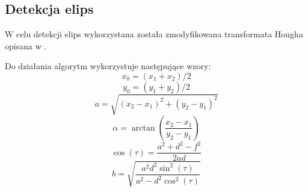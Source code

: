 \documentclass{classrep}
\begin{document}
\subsection{Detekcja elips}
W celu detekcji elips wykorzystana została zmodyfikowana transformata Hougha opisana w \cite{hough}. 

Do działania algorytm wykorzystuje następujące wzory:
\begin{equation}
\label{eq:x0}
 x_0 = (x_1 + x_2) / 2
\end{equation}
\begin{equation}
\label{eq:y0}
 y_0 = (y_1 + y_2) / 2
\end{equation}
\begin{equation}
\label{eq:a}
 a = \sqrt{(x_2 - x_1)^2 + (y_2 - y_1)^2}
\end{equation}
\begin{equation}
\label{eq:alfa}
 \alpha = \arctan{\left(\frac{x_2 - x_1}{y_2 - y_1}\right)}
\end{equation}
\begin{equation}
\label{eq:costau}
 \cos(\tau) = \frac{a^2 + d^2 - f^2}{2ad}
\end{equation}
\begin{equation}
\label{eq:b}
 b = \sqrt{\frac{a^2 d^2 \sin^2(\tau)}{a^2 - d^2\cos^2(\tau)}}
\end{equation}
\end{document}
